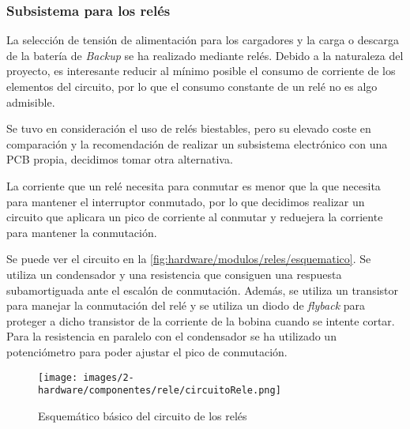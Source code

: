 \subsubsection{Subsistema para los relés}\label{subsubsec:hardware/circuito-reles}

La selección de tensión de alimentación para los cargadores y la carga o descarga de la batería de \textit{Backup} se ha realizado mediante relés. Debido a la naturaleza del proyecto, es interesante reducir al mínimo posible el consumo de corriente de los elementos del circuito, por lo que el consumo constante de un relé no es algo admisible.

Se tuvo en consideración el uso de relés biestables, pero su elevado coste en comparación y la recomendación de realizar un subsistema electrónico con una PCB propia, decidimos tomar otra alternativa. 

La corriente que un relé necesita para conmutar es menor que la que necesita para mantener el interruptor conmutado, por lo que decidimos realizar un circuito que aplicara un pico de corriente al conmutar y reduejera la corriente para mantener la conmutación. 

Se puede ver el circuito en la \autoref{fig:hardware/modulos/reles/esquematico}. Se utiliza un condensador y una resistencia que consiguen una respuesta subamortiguada ante el escalón de conmutación. Además, se utiliza un transistor para manejar la conmutación del relé y se utiliza un diodo de \textit{flyback} para proteger a dicho transistor de la corriente de la bobina cuando se intente cortar. Para la resistencia en paralelo con el condensador se ha utilizado un potenciómetro para poder ajustar el pico de conmutación. 

\begin{figure}[H]
    \centering
    \texttt{[image: images/2-hardware/componentes/rele/circuitoRele.png]}
    \caption{Esquemático básico del circuito de los relés}
    \label{fig:hardware/modulos/reles/esquematico}
\end{figure}

